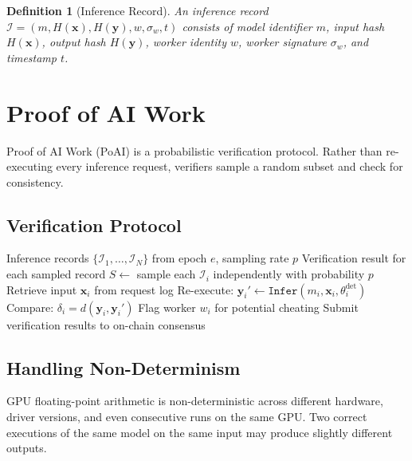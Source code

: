 \documentclass[11pt]{article}
\newtheorem{definition}{Definition}
\begin{document}
\begin{definition}[Inference Record]
An inference record $\mathcal{I} = (m, H(\mathbf{x}), H(\mathbf{y}), w, \sigma_w, t)$
consists of model identifier $m$, input hash $H(\mathbf{x})$, output hash
$H(\mathbf{y})$, worker identity $w$, worker signature $\sigma_w$, and
timestamp $t$.
\end{definition}

\section{Proof of AI Work}
\label{sec:poai}

Proof of AI Work (PoAI) is a probabilistic verification protocol. Rather than
re-executing every inference request, verifiers sample a random subset and check
for consistency.

\subsection{Verification Protocol}

\begin{algorithm}
\caption{Proof of AI Work Verification}
\label{alg:poai}
\begin{algorithmic}[1]
\Require Inference records $\{\mathcal{I}_1, \ldots, \mathcal{I}_N\}$ from
    epoch $e$, sampling rate $p$
\Ensure Verification result for each sampled record
\State $S \leftarrow$ sample each $\mathcal{I}_i$ independently with
    probability $p$
    \State Retrieve input $\mathbf{x}_i$ from request log
    \State Re-execute: $\mathbf{y}_i' \leftarrow \texttt{Infer}(m_i,
        \mathbf{x}_i, \theta_i^{\text{det}})$
    \State Compare: $\delta_i = d(\mathbf{y}_i, \mathbf{y}_i')$
        \State Flag worker $w_i$ for potential cheating
    \EndIf
\EndFor
\State Submit verification results to on-chain consensus
\end{algorithmic}
\end{algorithm}

\subsection{Handling Non-Determinism}

GPU floating-point arithmetic is non-deterministic across different hardware,
driver versions, and even consecutive runs on the same GPU. Two correct
executions of the same model on the same input may produce slightly different
outputs.
\end{document}
